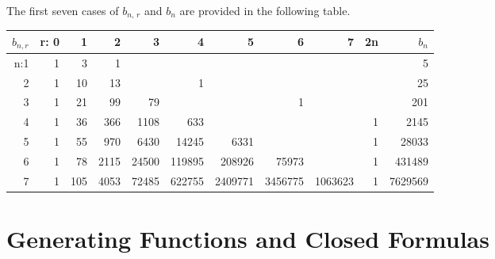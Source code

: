 \documentclass[11pt]{article}
\begin{document}
The first seven cases of $b_{n, \,r}$ and $b_{n}$ are provided in the following table.
\begin{table}[h]
\centering
\renewcommand{\arraystretch}{1.2} %
\begin{tabular}{|r|rrrrrrrr|r||r|}
\hline
$b_{n, r}$ &r: 0 & 1 & 2 & 3 & 4 & 5 & 6&7&\; 2n&$b_n$\\ \hline
n:1                          & 1  & 3  & 1  &  &&&&& &5 \\
2                          & 1  & 10  &  13 &  &1&&&& &25 \\
3                          & 1  & 21  & 99  & 79 &&&1&& &201\\
4                          & 1  & 36  & 366  & 1108 &633&&&&1 &2145\\ 
5                          & 1  & 55  & 970  & 6430  & 14245  &6331    &&&1&28033\\ 
6                          & 1  & 78  & 2115 & 24500 & 119895 & 208926 & 75973 &&1& 431489\\ 
7                          & 1  & 105 & 4053 & 72485 & 622755 & 2409771& 3456775 & 1063623 &1& 7629569\\ \hline
\end{tabular}
\end{table}

\section{Generating Functions and Closed Formulas}
\end{document}
